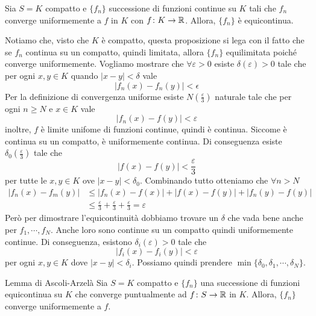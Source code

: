 \documentclass[a4paper]{article}
\begin{document}
\begin{snippetproposition}{}
    Sia \(S=K\) compatto e \(\{f_n\}\) successione di funzioni continue
    su \(K\) tali che \(f_n\) converge uniformemente a \(f\) in \(K\)
    con \(f \colon K \to \mathbb{R}\).
    Allora, \(\{f_n\}\) è equicontinua.
\end{snippetproposition}

\begin{snippetproof}{}
    Notiamo che, visto che \(K\) è compatto, questa proposizione si lega con il fatto
    che se \(f_n\) continua su un compatto, quindi limitata, allora \(\{f_n\}\)
    equilimitata poiché converge uniformemente. %
    Vogliamo mostrare che \(\forall \varepsilon > 0\)
    esiste \(\delta(\varepsilon) > 0\) tale che
    per ogni \(x,y \in K\) quando \(|x-y|<\delta\) vale
    \[
        |f_n(x) - f_n(y)| < \epsilon 
    \]
    Per la definizione di convergenza uniforme esiste
    \(N\left(\frac{\varepsilon}{3}\right)\)
    naturale tale che
    per ogni \(n \geq N\) e \(x \in K\)
    vale \[
        |f_n(x) - f(y)| < \varepsilon
    \]
    inoltre, \(f\) è limite unifome di funzioni continue,
    quindi è continua.
    Siccome è continua su un compatto, è uniformemente continua.
    Di conseguenza esiste \(\delta_0\left(\frac{\varepsilon}{3}\right)\) tale che
    \[
        |f(x) - f(y)| < \frac{\varepsilon}{3}
    \]
    per tutte le \(x,y \in K\) ove \(|x-y| < \delta_0\).
    Combinando tutto otteniamo che \(\forall n > N\)
    \begin{align*}
        |f_n(x) - f_m(y)| &\leq |f_n(x) - f(x)| + |f(x) - f(y)| + |f_n(y) - f(y)| \\
        &\leq \frac{\varepsilon}{3} + \frac{\varepsilon}{3} + \frac{\varepsilon}{3}
        = \varepsilon
    \end{align*}
    Però per dimostrare l'equicontinuità
    dobbiamo trovare un \(\delta\) che vada bene anche per \(f_1, \cdots, f_{N}\).
    Anche loro sono continue su un compatto quindi uniformemente continue.
    Di conseguenza,
    esistono \(\delta_i(\varepsilon) > 0\) tale che
    \[
        |f_i(x) - f_i(y)| < \varepsilon
    \]
    per ogni \(x,y \in K\)
    dove \(|x-y| < \delta_i\).
    Possiamo quindi prendere \(\min\{\delta_0, \delta_1, \cdots, \delta_N\}\).
\end{snippetproof}

\begin{snippetlemma}{Lemma di Ascoli-Arzelà}
    Sia \(S=K\) compatto e \(\{f_n\}\) una successione di funzioni equicontinua
    su \(K\) che converge puntualmente ad \(f \colon S \to \mathbb{R}\) in \(K\).
    Allora, \(\{f_n\}\) converge uniformemente a \(f\).
\end{snippetlemma}
\end{document}
